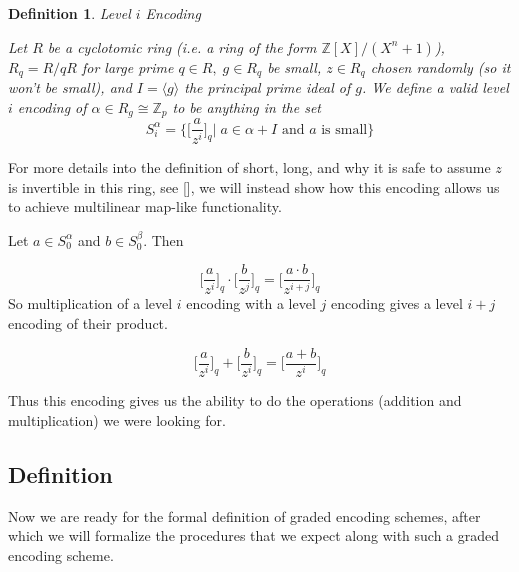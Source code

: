\documentclass[12pt,twoside]{reedthesis}
\newtheorem{definition}{Definition}
\newcommand{\Z}[0]{\mathbb{Z}}
\begin{document}
    
    \begin{definition}{Level $i$ Encoding}
    \par Let $R$ be a cyclotomic ring (i.e. a ring of the form $\mathbb{Z}[X]/(X^n +1)$), $R_q = R/qR$ for large prime $q\in R,  \; g\in R_q$ be small, $z \in R_q$ chosen randomly (so it won't be small), and $I = \langle g\rangle$ the principal prime ideal of $g$. We define a valid level $i$ encoding of $\alpha \in R_g \cong \Z_p$ to be anything in the set
    $$S_i^\alpha =\bigg\{\bigg[\frac{a}{z^i} \bigg]_q \bigg| \; a \in \alpha + I \text{ and $a$ is small}\bigg\}$$
    \end{definition}
    For more details into the definition of short, long, and why it is safe to assume $z$ is invertible in this ring, see [\cite{GGH13}], we will instead show how this encoding allows us to achieve multilinear map-like functionality. 
    \par Let $a \in S_0^\alpha$ and $b \in S_0^\beta$. Then 
    
    \newcommand{\Encode}[2]{\bigg[ \frac{#2}{z^{#1}}\bigg]_q}
    $$
    \Encode{i}{a} \cdot \Encode{j}{b} = \Encode{i+j}{a \cdot b}
   $$
   So multiplication of a level $i$ encoding with a level $j$ encoding gives a level $i+j$ encoding of their product.
   
   
   $$\Encode{i}{a} + \Encode{i}{b} = \Encode{i}{a+b}$$
   
   Thus this encoding gives us the ability to do the operations (addition and multiplication) we were looking for.
   \newcommand{\encode}[2]{\big[ \frac{#2}{z^{#1}}\big]_q}
   
   
   
   
   \subsection{Definition}
   
   \par Now we are ready for the formal definition of graded encoding schemes, after which we will formalize the procedures that we expect along with such a graded encoding scheme.
         
\end{document}
